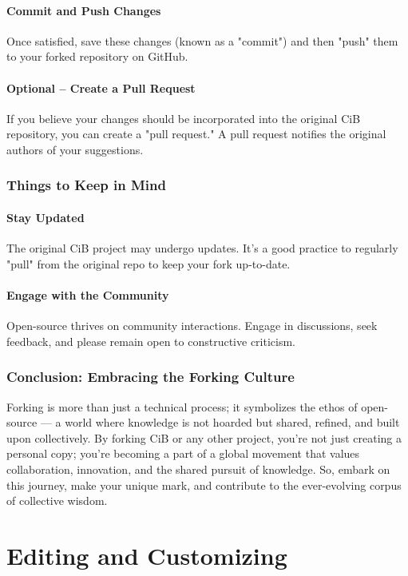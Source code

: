 \documentclass[a4paper,12pt]{book}
\begin{document}
\subsubsection*{Commit and Push Changes}
Once satisfied, save these changes (known as a "commit") and then "push" them to your forked repository on GitHub.

\subsubsection*{Optional – Create a Pull Request}
If you believe your changes should be incorporated into the original CiB repository, you can create a "pull request." A pull request notifies the original authors of your suggestions.

\subsection*{Things to Keep in Mind}
\subsubsection*{Stay Updated}
The original CiB project may undergo updates. It's a good practice to regularly "pull" from the original repo to keep your fork up-to-date.

\subsubsection*{Engage with the Community}
Open-source thrives on community interactions. Engage in discussions, seek feedback, and please remain open to constructive criticism.

\subsection*{Conclusion: Embracing the Forking Culture}
Forking is more than just a technical process; it symbolizes the ethos of open-source — a world where knowledge is not hoarded but shared, refined, and built upon collectively. By forking CiB or any other project, you're not just creating a personal copy; you're becoming a part of a global movement that values collaboration, innovation, and the shared pursuit of knowledge. So, embark on this journey, make your unique mark, and contribute to the ever-evolving corpus of collective wisdom.

\chapter{Editing and Customizing}
\end{document}
